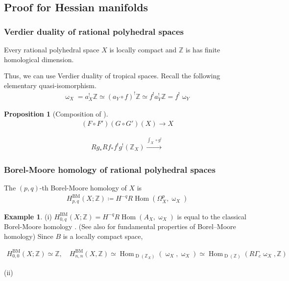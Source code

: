 \documentclass[a4paper,dvipdfmx,reqno,12pt]{amsart}
\theoremstyle{definition}
\newtheorem{Eg}[Thm]{Example}
\newtheorem{Prop}[Thm]{Proposition}
\newcommand{\deq}{\coloneqq}
\newcommand{\Z}{\mathbb{Z}}%
\newcommand{\opn}[1]{\operatorname{#1}}
\newcommand{\xto}[1]{\xrightarrow{#1}}
\numberwithin{equation}{section}
\begin{document}
\subsection{Proof for Hessian manifolds}

\subsubsection{Verdier duality of rational polyhedral spaces}

Every rational polyhedral space $X$ is locally compact and $\Z$ is has finite homological dimension.

Thus, we can use Verdier duality of tropical spaces.
Recall the following elementary quasi-isomorphism.
\begin{align}
  \upomega_X=a_X^{!}\Z\simeq (a_Y\circ f)^{!}\Z \simeq f^{!}a_Y^{!}\Z=f^{!}\upomega_Y
\end{align}



\begin{Prop}[Composition of ]
  \begin{align}
    (F\circ F')(G\circ G')(X)\to X
  \end{align}

  \begin{align}
    Rg_*Rf_*f^{!}g^{!}(\Z_X)\xto{\int_X\circ g^{!}}
  \end{align}

\end{Prop}

\subsubsection{Borel-Moore homology of rational polyhedral spaces}
The $(p,q)$-th Borel-Moore homology of $X$ is
\begin{align}
  H^{\opn{BM}}_{p,q}(X;\Z)\deq H^{-q}R\opn{Hom}(\Omega_X^{p},\upomega_X)
\end{align}

\begin{Eg} (i) $H_{0,q}^{\opn{BM}}(X;\Z)=H^{-q}R\opn{Hom}(A_X,\upomega_X)$ is equal to the classical Borel-Moore homology
  \cite[Lemma 4.8]{gross2019sheaftheoretic}.
(See also \cite[IX]{iversenCohomologySheaves1986a}
for fundamental properties of Borel--Moore homology)
  Since $B$ is a locally compact space,

  \begin{align}
    H_{0,0}^{\opn{BM}}(X;\Z)\simeq \Z,\quad H^{\opn{BM}}_{n,n}(X,\Z)\simeq \opn{Hom}_{\opn{D}(\Z_X)}(\upomega_X,\upomega_X)\simeq
    \opn{Hom}_{\opn{D}(\Z)}(R\Gamma_c\upomega_X,\Z)
  \end{align}

  (ii)

\end{Eg}
\end{document}
